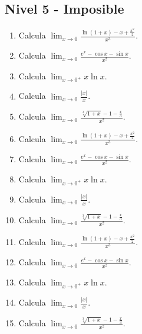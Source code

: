 \documentclass[11pt,a4paper]{article}
\begin{document}
\newpage

\subsection{Nivel 5 - Imposible}

\begin{enumerate}[label=\textbf{E\arabic*.},start=681]

\item Calcula $\displaystyle \lim_{x\to0}\frac{\ln(1+x)-x+\frac{x^2}{2}}{x^3}$.

\item Calcula $\displaystyle \lim_{x\to0}\frac{e^x-\cos x-\sin x}{x^2}$.

\item Calcula $\displaystyle \lim_{x\to0^+}x\ln x$.

\item Calcula $\displaystyle \lim_{x\to0}\frac{|x|}{x}$.

\item Calcula $\displaystyle \lim_{x\to0}\frac{\sqrt[3]{1+x}-1-\frac{x}{3}}{x^2}$.

\item Calcula $\displaystyle \lim_{x\to0}\frac{\ln(1+x)-x+\frac{x^2}{2}}{x^3}$.

\item Calcula $\displaystyle \lim_{x\to0}\frac{e^x-\cos x-\sin x}{x^2}$.

\item Calcula $\displaystyle \lim_{x\to0^+}x\ln x$.

\item Calcula $\displaystyle \lim_{x\to0}\frac{|x|}{x}$.

\item Calcula $\displaystyle \lim_{x\to0}\frac{\sqrt[3]{1+x}-1-\frac{x}{3}}{x^2}$.

\item Calcula $\displaystyle \lim_{x\to0}\frac{\ln(1+x)-x+\frac{x^2}{2}}{x^3}$.

\item Calcula $\displaystyle \lim_{x\to0}\frac{e^x-\cos x-\sin x}{x^2}$.

\item Calcula $\displaystyle \lim_{x\to0^+}x\ln x$.

\item Calcula $\displaystyle \lim_{x\to0}\frac{|x|}{x}$.

\item Calcula $\displaystyle \lim_{x\to0}\frac{\sqrt[3]{1+x}-1-\frac{x}{3}}{x^2}$.


\end{enumerate}
\end{document}
